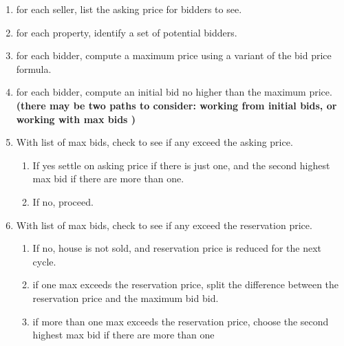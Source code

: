 \begin{enumerate}
    \item for each seller, list the asking price for bidders to see.
    
    \item for each property, identify a set of potential bidders.
    
    \item for each bidder, compute a maximum price using a variant of the bid price formula. 
    
    \item for each bidder, compute an initial bid no higher than  the maximum price. 
    \color{red}  
    \textbf{(there may be two paths to consider: working from initial bids, or working with max bids )}
    
    \item With list of max bids, check to see if any exceed the asking price. 
    \begin{enumerate}
        \item If yes settle on asking price if there is just one, and the second highest max bid if there are more than one.
        \item If no, proceed.
    \end{enumerate}
    
    \item With list of max bids, check to see if any exceed the reservation price. 
    \begin{enumerate}
        \item If no, house is not sold, and reservation price is reduced for the next cycle.
        \item if one max exceeds the reservation price,  split the difference between the reservation price and the maximum bid bid.
        \item if more than one max exceeds the reservation price, choose the second highest max bid if there are more than one
    \end{enumerate} 
\end{enumerate} \color{black}


